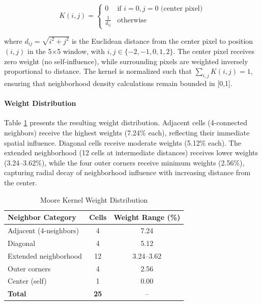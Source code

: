 \documentclass[12pt,a4paper]{article}
\begin{document}
\begin{equation}
K(i,j) = \begin{cases}
0 & \text{if } i=0, j=0 \text{ (center pixel)} \\
\frac{1}{d_{ij}} & \text{otherwise}
\end{cases}
\label{eq:moore_kernel}
\end{equation}

where $d_{ij} = \sqrt{i^2 + j^2}$ is the Euclidean distance from the center pixel to position $(i,j)$ in the 5$\times$5 window, with $i,j \in \{-2,-1,0,1,2\}$. The center pixel receives zero weight (no self-influence), while surrounding pixels are weighted inversely proportional to distance. The kernel is normalized such that $\sum_{i,j} K(i,j) = 1$, ensuring that neighborhood density calculations remain bounded in [0,1].

\paragraph{Weight Distribution}
Table \ref{tab:moore_weights} presents the resulting weight distribution. Adjacent cells (4-connected neighbors) receive the highest weights (7.24\% each), reflecting their immediate spatial influence. Diagonal cells receive moderate weights (5.12\% each). The extended neighborhood (12 cells at intermediate distances) receives lower weights (3.24--3.62\%), while the four outer corners receive minimum weights (2.56\%), capturing radial decay of neighborhood influence with increasing distance from the center.

\begin{table}[H]
\caption{Moore Kernel Weight Distribution}
\label{tab:moore_weights}
\centering
\small
\renewcommand{\arraystretch}{1.2}
\begin{tabular}{lcc}
\toprule
\textbf{Neighbor Category} & \textbf{Cells} & \textbf{Weight Range (\%)} \\
\midrule
Adjacent (4-neighbors) & 4 & 7.24 \\
Diagonal & 4 & 5.12 \\
Extended neighborhood & 12 & 3.24--3.62 \\
Outer corners & 4 & 2.56 \\
Center (self) & 1 & 0.00 \\
\midrule
\textbf{Total} & \textbf{25} & -- \\
\bottomrule
\end{tabular}
\end{table}
\end{document}
